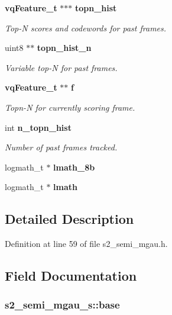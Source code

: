 \begin{DoxyCompactItemize}
\item 
{\bf vq\-Feature\-\_\-t} $\ast$$\ast$$\ast$ {\bf topn\-\_\-hist}
\begin{DoxyCompactList}\small\item\em Top-\/\-N scores and codewords for past frames. \end{DoxyCompactList}\item 
uint8 $\ast$$\ast$ {\bf topn\-\_\-hist\-\_\-n}
\begin{DoxyCompactList}\small\item\em Variable top-\/\-N for past frames. \end{DoxyCompactList}\item 
{\bf vq\-Feature\-\_\-t} $\ast$$\ast$ {\bf f}
\begin{DoxyCompactList}\small\item\em Topn-\/\-N for currently scoring frame. \end{DoxyCompactList}\item 
int {\bf n\-\_\-topn\-\_\-hist}
\begin{DoxyCompactList}\small\item\em Number of past frames tracked. \end{DoxyCompactList}\item 
logmath\-\_\-t $\ast$ {\bfseries lmath\-\_\-8b}\label{structs2__semi__mgau__s_a1900c90c8ab30d38288fb26b402eb325}

\item 
logmath\-\_\-t $\ast$ {\bfseries lmath}\label{structs2__semi__mgau__s_a8f8f7c72297132fb9a939c9981562ae6}

\end{DoxyCompactItemize}


\subsection{Detailed Description}


Definition at line 59 of file s2\-\_\-semi\-\_\-mgau.\-h.



\subsection{Field Documentation}
\subsubsection[{base}]{ s2\-\_\-semi\-\_\-mgau\-\_\-s\-::base}\label{structs2__semi__mgau__s_a9002aae86249006f0b045e5203ec9687}


